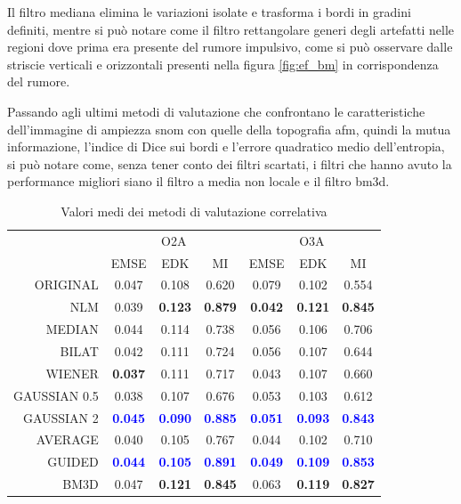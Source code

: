 \documentclass[../main.tex]{subfiles}
\begin{document}
Il filtro mediana elimina le variazioni isolate e trasforma i bordi in gradini definiti, mentre si può notare come il filtro rettangolare generi degli artefatti nelle regioni dove prima era presente del rumore impulsivo, come si può osservare dalle striscie verticali e orizzontali presenti nella figura \ref{fig:ef_bm} in corrispondenza del rumore.

Passando agli ultimi metodi di valutazione che confrontano le caratteristiche dell'immagine di ampiezza \acrshort{snom} con quelle della topografia \acrshort{afm}, quindi la mutua informazione, l'indice di Dice sui bordi e l'errore quadratico medio dell'entropia, si può notare come, senza tener conto dei filtri scartati, i filtri che hanno avuto la performance migliori siano il filtro a media non locale e il filtro \acrshort{bm3d}.\medskip

\begin{table}[ht]
	\centering
	\begin{tabular}{r||ccc||ccc}
		& \multicolumn{3}{c||}{O2A} & \multicolumn{3}{c}{O3A} \\
		& EMSE & EDK & MI & EMSE & EDK & MI \\
		\hline\hline
		ORIGINAL     & 0.047 & 0.108 & 0.620 & 0.079 & 0.102 & 0.554 \\
		NLM          & 0.039 & \textbf{0.123} & \textbf{0.879} & \textbf{0.042} & \textbf{0.121} & \textbf{0.845} \\
		MEDIAN       & 0.044 & 0.114 & 0.738 & 0.056 & 0.106 & 0.706 \\
		BILAT        & 0.042 & 0.111 & 0.724 & 0.056 & 0.107 & 0.644 \\
		WIENER       & \textbf{0.037} & 0.111 & 0.717 & 0.043 & 0.107 & 0.660 \\
		GAUSSIAN 0.5 & 0.038 & 0.107 & 0.676 & 0.053 & 0.103 & 0.612 \\
		GAUSSIAN 2   & \textcolor{blue}{\textbf{0.045}} & \textcolor{blue}{\textbf{0.090}} & \textcolor{blue}{\textbf{0.885}} & \textcolor{blue}{\textbf{0.051}} & \textcolor{blue}{\textbf{0.093}} & \textcolor{blue}{\textbf{0.843}} \\
		AVERAGE      & 0.040 & 0.105 & 0.767 & 0.044 & 0.102 & 0.710 \\
		GUIDED       & \textcolor{blue}{\textbf{0.044}} & \textcolor{blue}{\textbf{0.105}} & \textcolor{blue}{\textbf{0.891}} & \textcolor{blue}{\textbf{0.049}} & \textcolor{blue}{\textbf{0.109}} & \textcolor{blue}{\textbf{0.853}} \\
		BM3D         & 0.047 & \textbf{0.121} & \textbf{0.845} & 0.063 & \textbf{0.119} & \textbf{0.827}
	\end{tabular}
	\caption{Valori medi dei metodi di valutazione correlativa}
\end{table}
\end{document}
